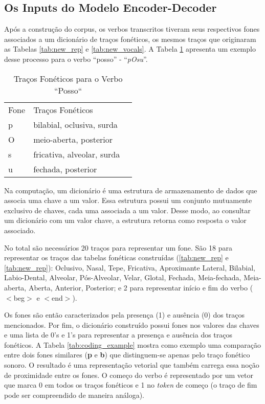 \subsection{Os Inputs do Modelo Encoder-Decoder}
\label{sec:inputs}

Após a construção do corpus, os verbos transcritos tiveram seus respectivos fones associados a um dicionário de traços fonéticos, os mesmos traços que originaram as Tabelas \ref{tab:new_rep} e \ref{tab:new_vocals}. A Tabela \ref{tab:pOsu} apresenta um exemplo desse processo para o verbo “posso” - “\textit{pOsu}”. 

\begin{table}[H]
\begin{center}
\begin{tabular}{lll}
Fone & Traços Fonéticos &  \\ \cline{1-2}
p & bilabial, oclusiva, surda &  \\
O & meio-aberta, posterior &  \\
s & fricativa, alveolar, surda &  \\
u & fechada, posterior & 
\end{tabular}
\end{center}
\caption{Traços Fonéticos para o Verbo “Posso“}
\label{tab:pOsu}
\end{table}

Na computação, um dicionário é uma estrutura de armazenamento de dados que associa uma chave a um valor. Essa estrutura possui um conjunto mutuamente exclusivo de chaves, cada uma associada a um valor. Desse modo, ao consultar um dicionário com um valor chave, a estrutura retorna como resposta o valor associado.

 No total são necessários 20 traços para representar um fone. São 18 para representar os traços das tabelas fonéticas construídas (\ref{tab:new_rep} e \ref{tab:new_rep}): Oclusivo, Nasal, Tepe, Fricativa, Aproximante Lateral, Bilabial, Labio-Dental, Alveolar, Pós-Alveolar, Velar, Glotal, Fechada, Meia-fechada, Meia-aberta, Aberta, Anterior, Posterior; e 2 para representar início e fim do verbo ($<$beg$>$ e $<$end$>$).

Os fones são então caracterizados pela presença (1) e ausência (0) dos traços mencionados. Por fim, o dicionário construído possui fones nos valores das chaves e uma lista de 0's e 1's para representar a presença e ausência dos traços fonéticos. A Tabela \ref{tab:coding_example} mostra como exemplo uma comparação entre dois fones similares (\textbf{p} e \textbf{b}) que distinguem-se apenas pelo traço fonético sonoro. O resultado é uma representação vetorial que também carrega essa noção de proximidade entre os fones. O começo do verbo é representado por um vetor que marca 0 em todos os traços fonéticos e 1 no \textit{token} de começo (o traço de fim pode ser compreendido de maneira análoga). 

